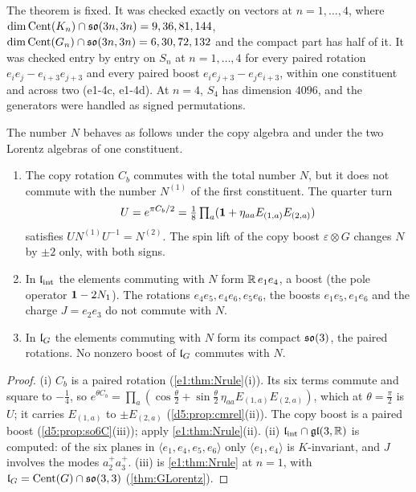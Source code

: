 The theorem is fixed. It was checked exactly on vectors at $n=1,\dots,4$, where $\dim\operatorname{Cent}(K_n)\cap\mathfrak{so}(3n,3n)=9,36,81,144$,
$\dim\operatorname{Cent}(G_n)\cap\mathfrak{so}(3n,3n)=6,30,72,132$ and the compact part has half of it. It was checked entry by entry on $S_n$ at $n=1,\dots,4$ for every
paired rotation $e_ie_j-e_{i+3}e_{j+3}$ and every paired boost $e_ie_{j+3}-e_je_{i+3}$, within one constituent and across two (e1-4c,
e1-4d). At $n=4$, $S_4$ has dimension $4096$, and the generators were handled as signed permutations.

\begin{proposition}
\label{e1:prop:Nlorentz}
The number $N$ behaves as follows under the copy algebra and under the two Lorentz algebras of one constituent.
\begin{enumerate}[label=(\roman*),leftmargin=2.2em]
\item The copy rotation $C_b$ commutes with the total number $N$, but it does not commute with the number $N^{(1)}$ of the first
constituent. The quarter turn
\[
U=e^{\pi C_b/2}=\tfrac18\textstyle\prod_a(\mathbf 1+\eta_{aa}E_{(1,a)}E_{(2,a)})
\]
satisfies $UN^{(1)}U^{-1}=N^{(2)}$. The spin lift of the copy boost $\varepsilon\otimes G$ changes $N$ by $\pm2$ only, with both signs.
\item In $\mathfrak l_{\rm int}$ the elements commuting with $N$ form $\mathbb{R}\,e_1e_4$, a boost (the pole operator $\mathbf 1-2N_1$). The rotations $e_4e_5,e_4e_6,e_5e_6$, the
boosts $e_1e_5,e_1e_6$ and the charge $J=e_2e_3$ do not commute with $N$.
\item In $\mathfrak l_G$ the elements commuting with $N$ form its compact $\mathfrak{so}(3)$, the paired rotations. No nonzero boost of $\mathfrak l_G$ commutes with $N$.
\end{enumerate}
\end{proposition}

\begin{proof}
(i) $C_b$ is a paired rotation (\cref{e1:thm:Nrule}(i)). Its six terms commute and square to $-\tfrac14$, so
$e^{\theta C_b}=\prod_a(\cos\tfrac\theta2+\sin\tfrac\theta2\,\eta_{aa}E_{(1,a)}E_{(2,a)})$, which at $\theta=\tfrac\pi2$ is $U$; it carries $E_{(1,a)}$ to
$\pm E_{(2,a)}$ (\cref{d5:prop:cmrel}(ii)). The copy
boost is a paired boost (\cref{d5:prop:so6C}(iii)); apply \cref{e1:thm:Nrule}(ii). (ii) $\mathfrak l_{\rm int}\cap\mathfrak{gl}(3,\mathbb{R})$ is computed: of
the six planes in $\langle e_1,e_4,e_5,e_6\rangle$ only $\langle e_1,e_4\rangle$ is $K$-invariant, and $J$ involves the modes $a^+_2a^+_3$. (iii) is
\cref{e1:thm:Nrule} at $n=1$, with $\mathfrak l_G=\operatorname{Cent}(G)\cap\mathfrak{so}(3,3)$ (\cref{thm:GLorentz}).
\end{proof}

